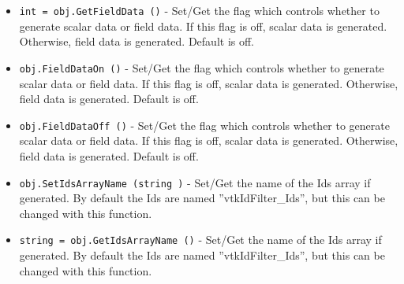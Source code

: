 \begin{itemize}
\item  \verb|int = obj.GetFieldData ()| -  Set/Get the flag which controls whether to generate scalar data
 or field data. If this flag is off, scalar data is generated.
 Otherwise, field data is generated. Default is off.

\item  \verb|obj.FieldDataOn ()| -  Set/Get the flag which controls whether to generate scalar data
 or field data. If this flag is off, scalar data is generated.
 Otherwise, field data is generated. Default is off.

\item  \verb|obj.FieldDataOff ()| -  Set/Get the flag which controls whether to generate scalar data
 or field data. If this flag is off, scalar data is generated.
 Otherwise, field data is generated. Default is off.

\item  \verb|obj.SetIdsArrayName (string )| -  Set/Get the name of the Ids array if generated. By default the Ids
 are named ''vtkIdFilter\_Ids'', but this can be changed with this function.

\item  \verb|string = obj.GetIdsArrayName ()| -  Set/Get the name of the Ids array if generated. By default the Ids
 are named ''vtkIdFilter\_Ids'', but this can be changed with this function.

\end{itemize}
